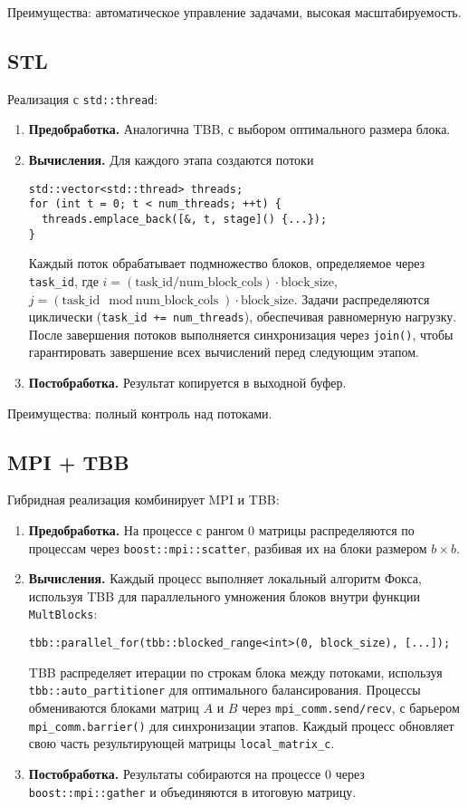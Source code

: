 \documentclass[12pt]{article}
\begin{document}
Преимущества: автоматическое управление задачами, высокая масштабируемость.

\subsection{STL}

Реализация с \texttt{std::thread}:

\begin{enumerate}
    \item \textbf{Предобработка.} Аналогична TBB, с выбором оптимального размера блока.
    \item \textbf{Вычисления.} Для каждого этапа создаются потоки
    \begin{lstlisting}
std::vector<std::thread> threads;
for (int t = 0; t < num_threads; ++t) {
  threads.emplace_back([&, t, stage]() {...});
}
    \end{lstlisting}
    Каждый поток обрабатывает подмножество блоков, определяемое через \texttt{task\_id}, где $i = (\text{task\_id} / \text{num\_block\_cols}) \cdot \text{block\_size}$, $j = (\text{task\_id} \mod \text{num\_block\_cols}) \cdot \text{block\_size}$. Задачи распределяются циклически (\texttt{task\_id += num\_threads}), обеспечивая равномерную нагрузку. После завершения потоков выполняется синхронизация через \texttt{join()}, чтобы гарантировать завершение всех вычислений перед следующим этапом.
    \item \textbf{Постобработка.} Результат копируется в выходной буфер.
\end{enumerate}

Преимущества: полный контроль над потоками.

\subsection{MPI + TBB}

Гибридная реализация комбинирует MPI и TBB:

\begin{enumerate}
    \item \textbf{Предобработка.} На процессе с рангом 0 матрицы распределяются по процессам через \texttt{boost::mpi::scatter}, разбивая их на блоки размером $b \times b$.
    \item \textbf{Вычисления.} Каждый процесс выполняет локальный алгоритм Фокса, используя TBB для параллельного умножения блоков внутри функции \texttt{MultBlocks}:
    \begin{lstlisting}
tbb::parallel_for(tbb::blocked_range<int>(0, block_size), [...]);
    \end{lstlisting}
    TBB распределяет итерации по строкам блока между потоками, используя \texttt{tbb::auto\_partitioner} для оптимального балансирования. Процессы обмениваются блоками матриц $A$ и $B$ через \texttt{mpi\_comm.send/recv}, с барьером \texttt{mpi\_comm.barrier()} для синхронизации этапов. Каждый процесс обновляет свою часть результирующей матрицы \texttt{local\_matrix\_c}.
    \item \textbf{Постобработка.} Результаты собираются на процессе 0 через \texttt{boost::mpi::gather} и объединяются в итоговую матрицу.
\end{enumerate}
\end{document}
